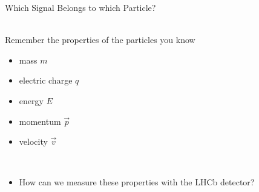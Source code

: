 
\begin{frame}{Which Signal Belongs to which Particle?}
    

\ \\
Remember the properties of the particles you know \\
\begin{itemize}
    \item<2-> mass \hfill $m$ \hspace{6cm}\,
    \item<2-> electric charge \hfill $q$ \hspace{6cm}\,
    \item<2-> energy \hfill $E$ \hspace{6cm}\,
    \item<2-> momentum \hfill $\vec{p} $ \hspace{6cm}\,
    \item<2-> velocity \hfill $\vec{v}$ \hspace{6cm}\,
 
\ \\
    \item<3->[\ding{220}] How can we measure these properties with the LHCb detector?

    
\end{itemize}
\end{frame}



